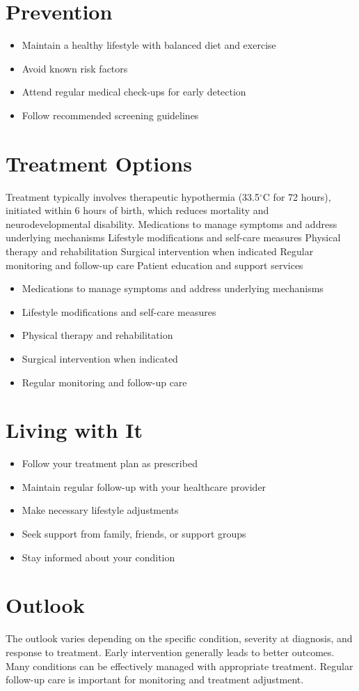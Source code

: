 \section{Prevention}
\begin{itemize}[noitemsep]
  \item Maintain a healthy lifestyle with balanced diet and exercise
  \item Avoid known risk factors
  \item Attend regular medical check-ups for early detection
  \item Follow recommended screening guidelines
\end{itemize}
\section{Treatment Options}
Treatment typically involves therapeutic hypothermia (33.5$^\circ$C for 72 hours), initiated within 6 hours of birth, which reduces mortality and neurodevelopmental disability. Medications to manage symptoms and address underlying mechanisms Lifestyle modifications and self-care measures Physical therapy and rehabilitation Surgical intervention when indicated Regular monitoring and follow-up care Patient education and support services

\begin{itemize}[noitemsep]
  \item Medications to manage symptoms and address underlying mechanisms
  \item Lifestyle modifications and self-care measures
  \item Physical therapy and rehabilitation
  \item Surgical intervention when indicated
  \item Regular monitoring and follow-up care
\end{itemize}
\section{Living with It}
\begin{itemize}[noitemsep]
  \item Follow your treatment plan as prescribed
  \item Maintain regular follow-up with your healthcare provider
  \item Make necessary lifestyle adjustments
  \item Seek support from family, friends, or support groups
  \item Stay informed about your condition
\end{itemize}
\section{Outlook}
The outlook varies depending on the specific condition, severity at diagnosis, and response to treatment. Early intervention generally leads to better outcomes. Many conditions can be effectively managed with appropriate treatment. Regular follow-up care is important for monitoring and treatment adjustment.
